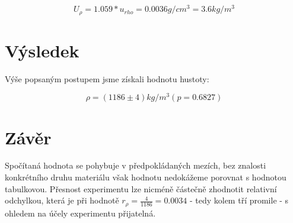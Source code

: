 \documentclass[czech,11pt,a4paper]{article}
\begin{document}
	\begin{equation*}
		U_{ \rho } = 1.059 * u_{rho} = 0.0036 g /cm^3 = 3.6 kg/m^3
	\end{equation*}
	
	\section{Výsledek}
	Výše popsaným postupem jsme získali hodnotu hustoty:
	
	\begin{equation*}
		\rho = (1186 \pm 4) kg/m^3 (p = 0.6827)  
	\end{equation*}
	
	\section{Závěr}
	Spočítaná hodnota se pohybuje v předpokládaných mezích, bez znalosti konkrétního druhu materiálu však hodnotu nedokážeme porovnat s hodnotou tabulkovou. Přesnost experimentu lze nicméně částečně zhodnotit relativní odchylkou, která je při hodnotě $ r_{\rho} = \frac {4}{1186} = 0.0034$ - tedy kolem tří promile - s ohledem na účely experimentu přijatelná.  
	
	
	
\end{document}
